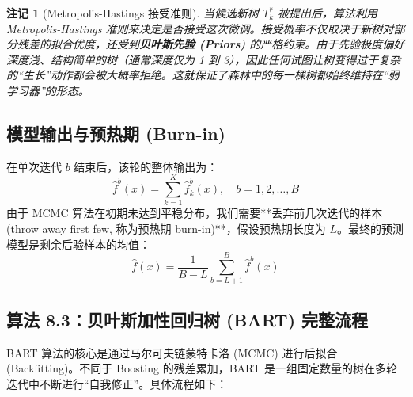 \documentclass[UTF8]{ctexart}
\newtheorem{remark}{注记}[section]
\numberwithin{equation}{section}
\begin{document}
\begin{remark}[Metropolis-Hastings 接受准则]
当候选新树 $T_k^*$ 被提出后，算法利用 Metropolis-Hastings 准则来决定是否接受这次微调。接受概率不仅取决于新树对部分残差的拟合优度，还受到\textbf{贝叶斯先验 (Priors)} 的严格约束。由于先验极度偏好深度浅、结构简单的树（通常深度仅为 1 到 3），因此任何试图让树变得过于复杂的“生长”动作都会被大概率拒绝。这就保证了森林中的每一棵树都始终维持在“弱学习器”的形态。
\end{remark}

\subsection{模型输出与预热期 (Burn-in)}
在单次迭代 $b$ 结束后，该轮的整体输出为：
\begin{equation}
    \hat{f}^b(x) = \sum_{k=1}^K \hat{f}_k^b(x), \quad b=1, 2, \dots, B
\end{equation}
由于 MCMC 算法在初期未达到平稳分布，我们需要**丢弃前几次迭代的样本 (throw away first few, 称为预热期 burn-in)**，假设预热期长度为 $L$。最终的预测模型是剩余后验样本的均值：
\begin{equation}
    \hat{f}(x) = \frac{1}{B-L} \sum_{b=L+1}^B \hat{f}^b(x)
\end{equation}

\subsection{算法 8.3：贝叶斯加性回归树 (BART) 完整流程}
BART 算法的核心是通过马尔可夫链蒙特卡洛 (MCMC) 进行后拟合 (Backfitting)。不同于 Boosting 的残差累加，BART 是一组固定数量的树在多轮迭代中不断进行“自我修正”。具体流程如下：
\end{document}
